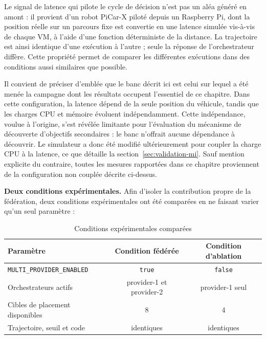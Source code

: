 Le signal de latence qui pilote le cycle de décision n'est pas un aléa généré en amont : il provient d'un robot PiCar-X piloté depuis un Raspberry Pi, dont la position réelle sur un parcours fixe est convertie en une latence simulée vis-à-vis de chaque VM, à l'aide d'une fonction déterministe de la distance. La trajectoire est ainsi identique d'une exécution à l'autre ; seule la réponse de l'orchestrateur diffère. Cette propriété permet de comparer les différentes exécutions dans des conditions aussi similaires que possible.

Il convient de préciser d'emblée que le banc décrit ici est celui sur lequel a été menée la campagne dont les résultats occupent l'essentiel de ce chapitre. Dans cette configuration, la latence dépend de la seule position du véhicule, tandis que les charges CPU et mémoire évoluent indépendamment. Cette indépendance, voulue à l'origine, s'est révélée limitante pour l'évaluation du mécanisme de découverte d'objectifs secondaires : le banc n'offrait aucune dépendance à découvrir. Le simulateur a donc été modifié ultérieurement pour coupler la charge CPU à la latence, ce que détaille la section~\ref{sec:validation-mi}. Sauf mention explicite du contraire, toutes les mesures rapportées dans ce chapitre proviennent de la configuration non couplée décrite ci-dessus.

\textbf{Deux conditions expérimentales.} Afin d'isoler la contribution propre de la fédération, deux conditions expérimentales ont été comparées en ne faisant varier qu'un seul paramètre :

\begin{table}[H]
    \centering
    \caption{Conditions expérimentales comparées}
    \label{tab:conditions-experimentales}
    \begin{tabular}{lcc}
        \toprule
        \textbf{Paramètre} & \textbf{Condition fédérée} & \textbf{Condition d'ablation} \\
        \midrule
        \texttt{MULTI\_PROVIDER\_ENABLED} & \texttt{true} & \texttt{false} \\
        Orchestrateurs actifs & provider-1 et provider-2 & provider-1 seul \\
        Cibles de placement disponibles & 8 & 4 \\
        Trajectoire, seuil et code & identiques & identiques \\
        \bottomrule
    \end{tabular}
\end{table}

